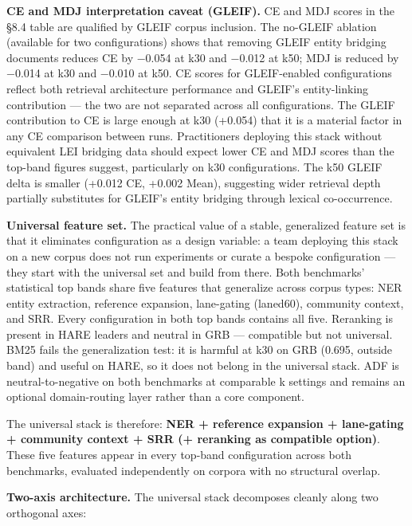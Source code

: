 \textbf{CE and MDJ interpretation caveat (GLEIF).} CE and MDJ scores in the §8.4 table are qualified by GLEIF corpus inclusion. The no-GLEIF ablation (available for two configurations) shows that removing GLEIF entity bridging documents reduces CE by −0.054 at k30 and −0.012 at k50; MDJ is reduced by −0.014 at k30 and −0.010 at k50. CE scores for GLEIF-enabled configurations reflect both retrieval architecture performance and GLEIF's entity-linking contribution --- the two are not separated across all configurations. The GLEIF contribution to CE is large enough at k30 (+0.054) that it is a material factor in any CE comparison between runs. Practitioners deploying this stack without equivalent LEI bridging data should expect lower CE and MDJ scores than the top-band figures suggest, particularly on k30 configurations. The k50 GLEIF delta is smaller (+0.012 CE, +0.002 Mean), suggesting wider retrieval depth partially substitutes for GLEIF's entity bridging through lexical co-occurrence.

\textbf{Universal feature set.} The practical value of a stable, generalized feature set is that it eliminates configuration as a design variable: a team deploying this stack on a new corpus does not run experiments or curate a bespoke configuration --- they start with the universal set and build from there. Both benchmarks' statistical top bands share five features that generalize across corpus types: NER entity extraction, reference expansion, lane-gating (laned60), community context, and SRR. Every configuration in both top bands contains all five. Reranking is present in HARE leaders and neutral in GRB --- compatible but not universal. BM25 fails the generalization test: it is harmful at k30 on GRB (0.695, outside band) and useful on HARE, so it does not belong in the universal stack. ADF is neutral-to-negative on both benchmarks at comparable k settings and remains an optional domain-routing layer rather than a core component.

The universal stack is therefore: \textbf{NER + reference expansion + lane-gating + community context + SRR (+ reranking as compatible option)}. These five features appear in every top-band configuration across both benchmarks, evaluated independently on corpora with no structural overlap.

\textbf{Two-axis architecture.} The universal stack decomposes cleanly along two orthogonal axes:

